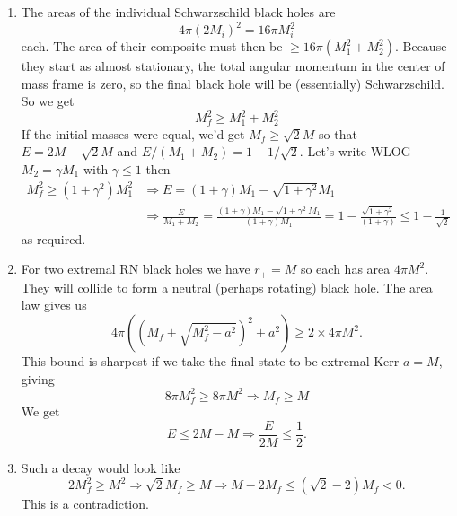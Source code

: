 \documentclass[11pt, class=article, crop=false]{standalone}
\begin{document}
\begin{enumerate}
	\begin{enumerate}
		\item The areas of the individual Schwarzschild black holes are 
	\[
		4 \pi (2 M_i)^2 = 16 \pi M_i^2
	\]
	each. The area of their composite must then be $\geq 16 \pi (M_1^2 + M_2^2)$. Because they start as almost stationary, the total angular momentum in the center of mass frame is zero, so the final black hole will be (essentially) Schwarzschild. So we get 
	\[
		M_f^2 \geq M_1^2 + M_2^2
	\]
	If the initial masses were equal, we'd get $M_f \geq \sqrt{2} M$ so that $E = 2 M - \sqrt 2 M$ and $E/(M_1 + M_2) = 1- 1/\sqrt{2}$. Let's write WLOG $M_2 = \gamma M_1$ with $\gamma \leq 1$ then 
	\[
	\begin{aligned}
		M_f^2 \geq (1+\gamma^2) M_1^2  &\Rightarrow E = (1+\gamma) M_1 - \sqrt{1+\gamma^2} M_1\\ 
		&\Rightarrow \frac{E}{M_1 + M_2} = \frac{(1+\gamma) M_1 - \sqrt{1+\gamma^2} M_1}{(1+\gamma) M_1} = 1 -\frac{\sqrt{1+\gamma^2}}{(1+\gamma)} \leq 1 - \frac{1}{\sqrt 2}
	\end{aligned}
	\]
	as required. 
	\item For two extremal RN black holes we have $r_+ = M$ so each has area $4 \pi M^2$. They will collide to form a neutral (perhaps rotating) black hole. The area law gives us 
	\[
		4 \pi ((M_f + \sqrt{M_f^2 - a^2})^2 + a^2) \geq 2 \times 4 \pi M^2.
	\]
	This bound is sharpest if we take the final state to be extremal Kerr $a = M$, giving
	\[
		 8 \pi M_f^2 \geq 8 \pi M^2 \Rightarrow M_f \geq M
	\]
	We get 
	\[
		E \leq 2M - M \Rightarrow \frac{E}{2M} \leq \frac12.
	\]
	
	\item Such a decay would look like 
	\[
		2 M_f^2  \geq M^2 \Rightarrow \sqrt{2} M_f \geq M  \Rightarrow M - 2 M_f \leq (\sqrt{2} - 2) M_f < 0.
	\]
	This is a contradiction. 
	\end{enumerate}
	

\end{enumerate}
\end{document}
